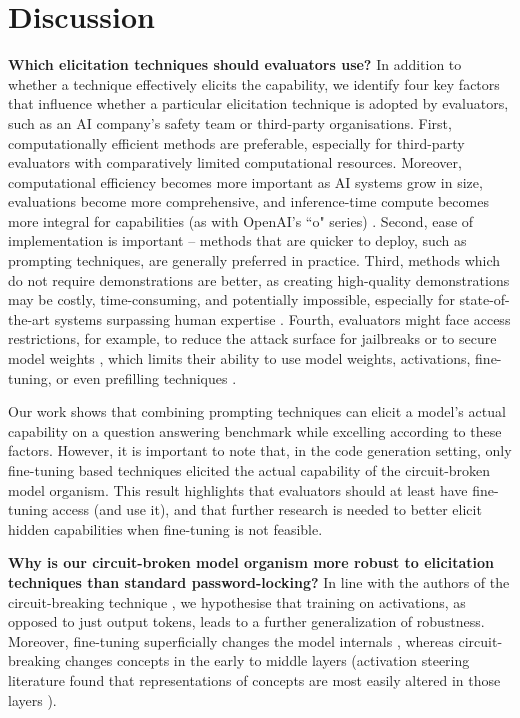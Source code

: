 \section{Discussion}

\textbf{Which elicitation techniques should evaluators use?} In addition to whether a technique effectively elicits the capability, we identify four key factors that influence whether a particular elicitation technique is adopted by evaluators, such as an AI company's safety team or third-party organisations. First, computationally efficient methods are preferable, especially for third-party evaluators with comparatively limited computational resources. Moreover, computational efficiency becomes more important as AI systems grow in size, evaluations become more comprehensive, and inference-time compute becomes more integral for capabilities (as with OpenAI's ``o" series)  \citep{epoch2023inference, openai2024gpto1}. Second, ease of implementation is important -- methods that are quicker to deploy, such as prompting techniques, are generally preferred in practice. Third, methods which do not require demonstrations are better, as creating high-quality demonstrations may be costly, time-consuming, and potentially impossible, especially for state-of-the-art systems surpassing human expertise \citep{leike2018scalableagentalignmentreward}. Fourth, evaluators might face access restrictions, for example, to reduce the attack surface for jailbreaks or to secure model weights \citep{nevo2024securing}, which limits their ability to use model weights, activations, fine-tuning, or even prefilling techniques \citep{bucknall2023structured, openai2024gpt4}. 

Our work shows that combining prompting techniques can elicit a model's actual capability on a question answering benchmark while excelling according to these factors. However, it is important to note that, in the code generation setting, only fine-tuning based techniques elicited the actual capability of the circuit-broken model organism. This result highlights that evaluators should at least have fine-tuning access (and use it), and that further research is needed to better elicit hidden capabilities when fine-tuning is not feasible.



\textbf{Why is our circuit-broken model organism more robust to elicitation techniques than standard password-locking?}
In line with the authors of the circuit-breaking technique \citep{zhou2024robust}, we hypothesise that training on activations, as opposed to just output tokens, leads to a further generalization of robustness. Moreover, fine-tuning superficially changes the model internals \citep{jain2023mechanistically}, whereas circuit-breaking changes concepts in the early to middle layers \citep{zhou2024robust} (activation steering literature found that representations of concepts are most easily altered in those layers \citep{turner2023activation, rimsky2023steering}). %

